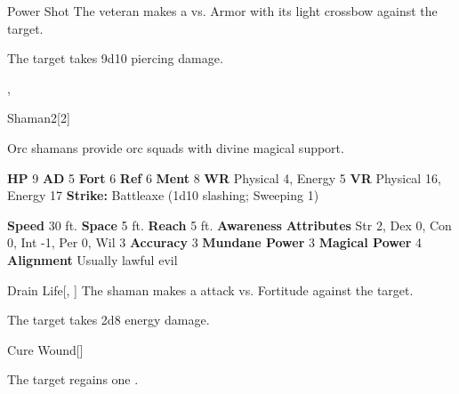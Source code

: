     \begin{freeability}{Power Shot}
       The veteran makes a 
         vs. Armor
        with its light crossbow against the target.
    
    \hit The target takes 9d10 piercing damage.
    \end{freeability}
  ,
  \begin{monsubsection}{Shaman}{2}[2]
    \vspace{-1em}\vspace{-1em}
    \vspace{0em}

    
        Orc shamans provide orc squads with divine magical support.
      
    

    \begin{spellcontent}
      \begin{spelltargetinginfo}
        \pari \textbf{HP} 9 \monsep
          \textbf{AD} 5 \monsep
          \textbf{Fort} 6 \monsep
          \textbf{Ref} 6 \monsep
          \textbf{Ment} 8
        \pari \textbf{WR} Physical 4, Energy 5 \monsep
        \textbf{VR} Physical 16, Energy 17
        \pari \textbf{Strike:}
            Battleaxe  (1d10 slashing; Sweeping 1)
      \end{spelltargetinginfo}
    \end{spellcontent}
    \begin{monsterfooter}
      \pari \textbf{Speed} 30 ft. \monsep
        \textbf{Space} 5 ft. \monsep
        \textbf{Reach} 5 ft.
      \pari \textbf{Awareness} 
      \pari \textbf{Attributes}
        Str 2, Dex 0,
        Con 0, Int -1,
        Per 0, Wil 3
      \pari \textbf{Accuracy} 3 \monsep
        \textbf{Mundane Power} 3 \monsep
      \textbf{Magical Power} 4
      \pari \textbf{Alignment} Usually lawful evil
    \end{monsterfooter}
  \end{monsubsection}
  \begin{freeability}{Drain Life}[, ]
       The shaman makes a  attack
        vs. Fortitude against the target.
    
    \hit The target takes 2d8 energy damage.
    \end{freeability}
  
      
    \begin{freeability}{Cure Wound}[]
      
            The target regains one .
          
    \end{freeability}
  
